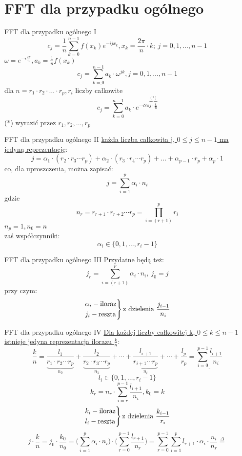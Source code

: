 \section{FFT dla przypadku ogólnego}
\begin{frame}{FFT dla przypadku ogólnego I}
	\[
		c_j = \frac{1}{n} \sum\limits_{k = 0}^{n-1} f(x_k)e^{-ijx_k}, x_k = \frac{2\pi}{n} \cdot k;\ j = 0, 1, \dots, n-1
	\]
	$\omega = e^{-i\frac{2\pi}{n}}, a_k = \frac{1}{n} f(x_k)$
	\[
		\underline{c_j = \sum\limits_{k = 0}^{n-1} a_k \cdot \omega^{jk}}, j = 0, 1, \dots, n-1
	\]
	dla $n = r_1 \cdot r_2 \cdot \dots \cdot r_p, r_i$ liczby całkowite
	\[
		c_j = \sum\limits_{k = 0}^{n-1} a_k \cdot e^{-i2\pi \overbrace{j \cdot \frac{k}{n}}^{(*)}}
		\tag{16.29}
	\]
	(*) wyrazić przez $r_1, r_2, \dots, r_p$
\end{frame}
\begin{frame}{FFT dla przypadku ogólnego II}
	\underline{każda liczba całkowita j, $0 \leq j \leq n-1$ ma jedyną reprezentację}:
	\[
		j = \alpha_1 \cdot (r_2 \cdot r_3 \cdots r_p) + \alpha_2 \cdot (r_3 \cdot r_4 \cdots r_p) + \dots + \alpha_{p-1} \cdot r_p + \alpha_p \cdot 1
	\]
	co, dla uproszczenia, można zapisać:
	\[
		j = \sum\limits_{i = 1}^{p} \alpha_i \cdot n_i
	\]
	gdzie
	\[
		n_r = r_{r+1} \cdot r_{r+2} \cdots r_p = \prod\limits_{i = (r+1)}^{p} r_i
	\]
	$n_p = 1, n_0 = n$ \\
	zaś współczynniki:
	\[
		\alpha_i \in \{0, 1, \dots, r_i - 1\}
	\]
\end{frame}
\begin{frame}{FFT dla przypadku ogólnego III}
	Przydatne będą też:
	\[
		j_r = \sum\limits_{i = (r+1)}^{p} \alpha_i \cdot n_i,\  j_0 = j
	\]
	przy czym:
	\[
		\begin{rcases}
			\alpha_i - \text{iloraz} \\
			j_i - \text{reszta}
		\end{rcases}
		\text{z dzielenia } \frac{j_{i-1}}{n_i}
	\]
\end{frame}
\begin{frame}{FFT dla przypadku ogólnego IV}
	\underline{Dla każdej liczby całkowitej k, $0 \leq k \leq n-1$} \\
	\underline{istnieje jedyna reprezentacja ilorazu $\frac{k}{n}$}:
	\[
		\frac{k}{n} = \frac{l_1}{\underbrace{r_1 \cdot r_2 \cdots r_p}_{n_0}} + \frac{l_2}{\underbrace{r_2 \cdot r_3 \cdots r_p}_{n_1}} + \cdots + \frac{l_{i+1}}{\underbrace{r_{i+1} \cdots r_p}_{n_i}} + \cdots + \frac{l_p}{r_p} = \underline{\sum\limits_{i = 0}^{p-1} \frac{l_{i+1}}{n_i}}
	\]
	\[
		l_i \in \{0, 1, \dots, r_i - 1\}
	\]
	\[
		k_r = n_r \cdot \sum\limits_{i = r}^{p-1} \frac{l_{i+1}}{n_i}, k_0 = k
	\]
	\[
		\begin{rcases}
			k_i - \text{iloraz} \\
			l_i - \text{reszta}
		\end{rcases}
		\text{z dzielenia } \frac{k_{i-1}}{r_i}
	\]
	\[
		j \cdot \frac{k}{n} = j_0 \cdot \frac{k_0}{n_0} = \Bigg( \sum\limits_{i = 1}^{p} \alpha_i \cdot n_i \Bigg) \cdot \Bigg( \sum\limits_{r = 0}^{p-1} \frac{l_{r+1}}{n_r} \Bigg) = \sum\limits_{r = 0}^{p-1} \sum\limits_{i = 1}^{p} l_{r+1} \cdot \alpha_i \cdot \frac{n_i}{n_r} \stackrel{\Delta}{=}	
	\]
\end{frame}
